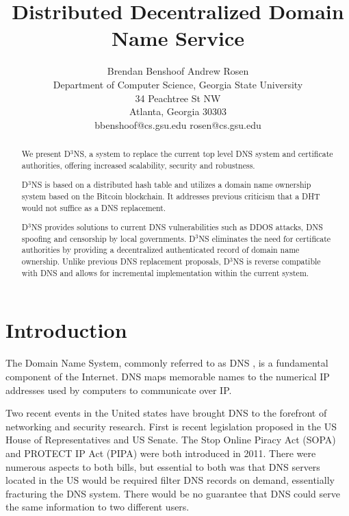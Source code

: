 \documentclass[11pt]{IEEEtran} %
\title{Distributed Decentralized Domain Name Service}
\author{
Brendan Benshoof \qquad Andrew Rosen  \\Department of Computer Science, Georgia State University\\ 34 Peachtree St NW \\ Atlanta, Georgia 30303\\  bbenshoof@cs.gsu.edu \qquad rosen@cs.gsu.edu }
\begin{document}
\maketitle

\begin{abstract}

We present D$^{3}$NS, a system to replace the current top level DNS system and certificate authorities, offering increased scalability, security and robustness. 

D$^{3}$NS is based on a distributed hash table and utilizes a domain name ownership system based on the Bitcoin blockchain.  It addresses previous criticism that a DHT would not suffice as a DNS replacement. 

D$^{3}$NS provides solutions to current DNS vulnerabilities such as DDOS attacks, DNS spoofing and censorship by local governments. D$^{3}$NS eliminates the need for certificate authorities by providing a decentralized authenticated record of domain name ownership. Unlike previous DNS replacement proposals, D$^{3}$NS is reverse compatible with DNS and allows for incremental implementation within the current system.





\end{abstract}


\section{Introduction}
The Domain Name System, commonly referred to as DNS \cite{mockapetris2003rfc} \cite{mockapetris2004rfc}, is a fundamental component of the Internet.  DNS maps memorable names to the numerical IP addresses used by computers to communicate over IP. 

Two recent events in the United states have brought DNS to the forefront of networking and security research.  First is recent legislation proposed in the US House of Representatives and US Senate. The Stop Online Piracy Act (SOPA) \cite{sopa} and PROTECT IP Act (PIPA) \cite{pipa} were both introduced in 2011.  There were numerous aspects to both bills, but essential to both was that DNS servers located in the US would be required filter DNS records on demand, essentially fracturing the DNS system.  There would be no guarantee that DNS could serve the same information to two different users.
\end{document}
